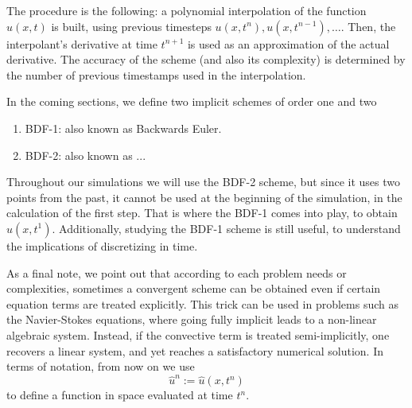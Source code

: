 \documentclass[../main.tex]{subfiles}
\begin{document}
The procedure is the following: a polynomial interpolation of the function $u(x,t)$ is built, 
using previous timesteps $u(x,t^{n}), u(x,t^{n-1}), \ldots$.
Then, the interpolant's derivative at time $t^{n+1}$ is used as an approximation of the actual derivative.
The accuracy of the scheme (and also its complexity) is determined by the number of previous timestamps used in the interpolation. 

In the coming sections, we define two implicit schemes of order one and two
\begin{enumerate}
    \item BDF-1: also known as Backwards Euler.
    \item BDF-2: also known as ... 
\end{enumerate}
Throughout our simulations we will use the BDF-2 scheme, but since it uses two points from the past, 
it cannot be used at the beginning of the simulation, in the calculation of the first step. 
That is where the BDF-1 comes into play, to obtain $u(x,t^1)$.
Additionally, studying the BDF-1 scheme is still useful, to understand the implications of discretizing in time.  

As a final note, we point out that according to each problem needs or complexities, sometimes a convergent scheme can be obtained even if certain equation terms are treated explicitly.
This trick can be used in problems such as the Navier-Stokes equations, where going fully implicit leads to a non-linear algebraic system. 
Instead, if the convective term is treated semi-implicitly, one recovers a linear system, and yet reaches a satisfactory numerical solution.
In terms of notation, from now on we use
\begin{equation}
    \hat{u}^n := \hat{u}(x,t^n)
\end{equation}
to define a function in space evaluated at time $t^n$.
\end{document}

